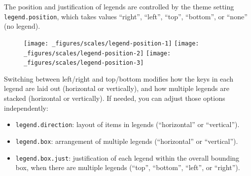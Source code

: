 The position and justification of legends are controlled by the theme
setting \texttt{legend.position}, which takes values ``right'',
``left'', ``top'', ``bottom'', or ``none'' (no legend).

\begin{Shaded}
\begin{Highlighting}[]
\StringTok{ }\NormalTok{(} \NormalTok{:}\NormalTok{, } \NormalTok{:}\NormalTok{, } \NormalTok{(}\NormalTok{, }\NormalTok{, }\NormalTok{))}
\StringTok{ }\StringTok{ }
\StringTok{  }\NormalTok{(}\NormalTok{(}  \NormalTok{) +}\StringTok{ }
\StringTok{  }\NormalTok{(}\NormalTok{) +}\StringTok{ }
\StringTok{  }\NormalTok{(}\NormalTok{)}

\StringTok{ }\NormalTok{(} \NormalTok{) }
\StringTok{ }\NormalTok{(} \NormalTok{)}
\StringTok{ }\NormalTok{(} \NormalTok{)}
\end{Highlighting}
\end{Shaded}

\begin{figure}[H]
  \texttt{[image: \_figures/scales/legend-position-1]}%
  \texttt{[image: \_figures/scales/legend-position-2]}%
  \texttt{[image: \_figures/scales/legend-position-3]}
\end{figure}

Switching between left/right and top/bottom modifies how the keys in
each legend are laid out (horizontal or vertically), and how multiple
legends are stacked (horizontal or vertically). If needed, you can
adjust those options independently:

\begin{itemize}
\item
  \texttt{legend.direction}: layout of items in legends (``horizontal''
  or ``vertical'').
\item
  \texttt{legend.box}: arrangement of multiple legends (``horizontal''
  or ``vertical'').
\item
  \texttt{legend.box.just}: justification of each legend within the
  overall bounding box, when there are multiple legends (``top'',
  ``bottom'', ``left'', or ``right'').
\end{itemize}

